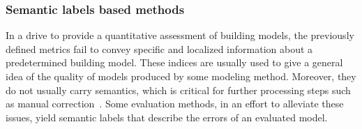         \subsubsection{Semantic labels based methods}
            In a drive to provide a quantitative assessment of building models, the previously defined metrics fail to convey specific and localized information about a predetermined building model.
            These indices are usually used to give a general idea of the quality of models produced by some modeling method.
            Moreover, they do not usually carry semantics, which is critical for further processing steps such as manual correction~\parencite{elberink2011quality}.
            Some evaluation methods, in an effort to alleviate these issues, yield semantic labels that describe the errors of an evaluated model.

